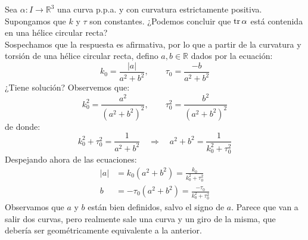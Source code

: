 \begin{ejercicio}
    Sea $\alpha:I\to \mathbb{R}^3$ una curva p.p.a. y con curvatura estrictamente positiva. Supongamos que $k$ y $\tau$ son constantes. ¿Podemos concluir que $\operatorname{tr}\alpha$ está contenida en una hélice circular recta?\\

    \noindent
    Sospechamos que la respuesta es afirmativa, por lo que a partir de la curvatura y torsión de una hélice circular recta, defino $a,b\in \mathbb{R}$ dados por la ecuación:
    \begin{equation*}
        k_0 = \frac{|a|}{a^2+b^2}, \qquad \tau_0 = \frac{-b}{a^2+b^2}
    \end{equation*}
    ¿Tiene solución? Observemos que:
    \begin{equation*}
        k_0^2 = \frac{a^2}{{(a^2+b^2)}^{2}}, \qquad \tau_0^2 = \frac{b^2}{{(a^2+b^2)}^{2}}
    \end{equation*}
    de donde:
    \begin{equation*}
        k_0^2 + \tau_0^2 = \frac{1}{a^2+b^2} \quad\Longrightarrow\quad a^2+b^2 = \frac{1}{k_0^2 + \tau_0^2}
    \end{equation*}
    Despejando ahora de las ecuaciones:
    \begin{align*}
        |a| &= k_0 (a^2 + b^2) = \frac{k_0}{k_0^2+\tau_0^2} \\
        b &= -\tau_0 (a^2+b^2) = \frac{-\tau_0}{k_0^2+\tau_0^2}
    \end{align*}
    Observamos que $a$ y $b$ están bien definidos, salvo el signo de $a$. Parece que van a salir dos curvas, pero realmente sale una curva y un giro de la misma, que debería ser geométricamente equivalente a la anterior.\\


\end{ejercicio}

